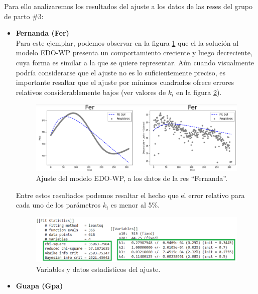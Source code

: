 Para ello analizaremos los resultados del ajuste a los datos de las reses del grupo de parto \#3:\\

\begin{itemize}
    \item \textbf{Fernanda (Fer)}\\
    
    Para este ejemplar, podemos observar en la figura \ref{ajustemodFerpng} que el la solución al modelo EDO-WP presenta un comportamiento creciente y luego decreciente, cuya forma  es similar a la que se quiere representar. Aún cuando visualmente podría considerarse que el ajuste no es lo suficientemente preciso, es importante resaltar que el ajuste por mínimos cuadrados ofrece errores relativos considerablemente bajos (ver valores de $k_{i}$ en la figura \ref{ajustemodFerstatspng}).
        \begin{figure}[H]
            \centering
            \includegraphics[scale=0.5]{img/ajustemodFer.png}
            \caption{Ajuste del modelo EDO-WP, a los datos de la res ``Fernanda''.}
            \label{ajustemodFerpng}
        \end{figure}
    Entre estos resultados podemos resaltar el hecho que el error relativo para cada uno de los parámetros $k_{i}$ es menor al 5\%.
        \begin{figure}[H]
            \centering
            \includegraphics[scale=0.65]{img/ajustemodFerstats.png}
            \caption{Variables y datos estadísticos del ajuste.}
            \label{ajustemodFerstatspng}
        \end{figure}
        
    \pagebreak
    \item \textbf{Guapa (Gpa)}\\
    

\end{itemize}
